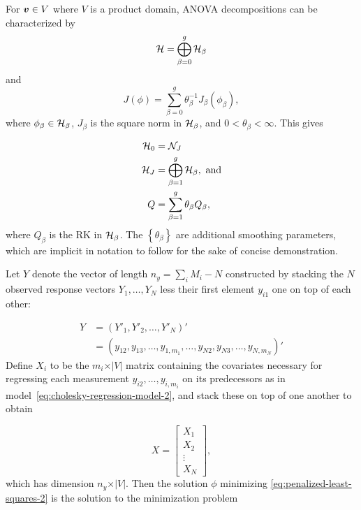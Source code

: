 \bigskip

For $\mbox{\boldmath $v$} \in V$ where $V$ is a product domain, ANOVA decompositions can be characterized by 
\begin{equation}\label{eq:ssanova-decomposition-of-RKHS}
\mathcal{H} = \bigoplus\limits_{\beta=0}^{g} \mathcal{H}_\beta
\end{equation}
\noindent
and
\begin{equation}\label{eq:ssanova-decomposition-of-penalty}
J\left(\phi\right) = \sum_{\beta=0}^{g} \theta^{-1}_\beta J_\beta \left( \phi_\beta \right),
\end{equation}
\noindent
where $\phi_\beta \in \mathcal{H}_\beta$, $J_\beta$ is the square norm in $\mathcal{H}_\beta$, and $0 < \theta_\beta < \infty$. This gives 

\begin{align*}
\mathcal{H}_0 &= \mathcal{N}_J \\
\mathcal{H}_J &= \bigoplus\limits_{\beta=1}^{g} \mathcal{H}_\beta, \mbox{ and} \\
Q &= \sum_{\beta=1}^g \theta_\beta Q_\beta,
\end{align*}
\noindent
where $Q_\beta$ is the RK in $\mathcal{H}_\beta$. The $\left \{ \theta_\beta \right\}$ are additional smoothing parameters, which are implicit in notation to follow for the sake of concise demonstration. 

\bigskip


\bigskip
\noindent
Let $Y$ denote the vector of length $n_y= \sum_{i} M_i - N$  constructed by stacking the $N$ observed response vectors $Y_1,\dots, Y_N$ less their first element $y_{i1}$ one on top of each other:

\begin{align*}
Y &= \left( Y'_1, Y'_2, \dots, Y'_{N} \right)'\\
 &= \left( y_{12}, y_{13},\dots, y_{1,m_1}, \dots, y_{N2}, y_{N3},\dots, y_{N,m_N} \right)'
\end{align*}
\noindent
Define $X_i$ to be the $m_i \times \vert V \vert$ matrix containing the covariates necessary for regressing each measurement $y_{i2}, \dots, y_{i,m_i}$ on its predecessors as in model~\ref{eq:cholesky-regression-model-2}, and stack these on top of one another to obtain

\begin{equation} \label{eq:ar-design-matrix-1}
X = \begin{bmatrix}
X_1 \\
X_2\\
\vdots \\
X_N
\end{bmatrix},
\end{equation}
\noindent
which has dimension $n_y \times \vert V \vert$. Then the solution $\phi$  minimizing \ref{eq:penalized-least-squares-2}  is the solution to the minimization problem

